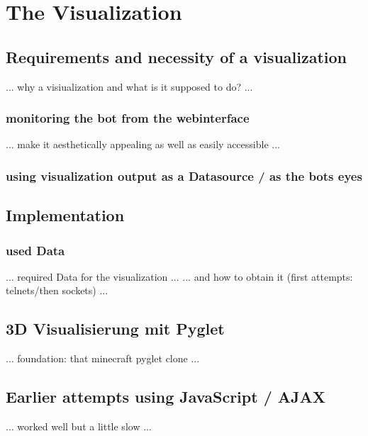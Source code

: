 \chapter{The Visualization}

\section{Requirements and necessity of a visualization}
... why a visiualization and what is it supposed to do? ...

\subsection{monitoring the bot from the webinterface}
... make it aesthetically appealing as well as easily accessible ...

\subsection{using visualization output as a Datasource / as the bots eyes}

\section{Implementation}

\subsection{used Data}
... required Data for the visualization ...
... and how to obtain it (first attempts: telnets/then sockets) ...

\section{3D Visualisierung mit Pyglet}
... foundation: that minecraft pyglet clone ...

\section{Earlier attempts using JavaScript / AJAX}
... worked well but a little slow ...